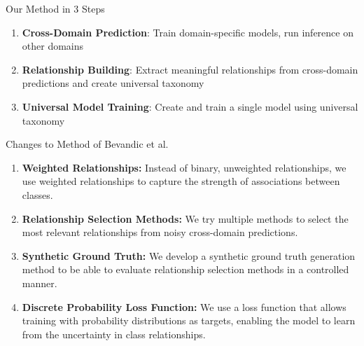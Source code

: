 \documentclass[aspectratio=169]{beamer}
\begin{document}
\begin{frame}{Our Method in 3 Steps}
    \begin{center}
    \end{center}

    \vspace{1em}

    \begin{enumerate}
        \item \textbf{Cross-Domain Prediction}: Train domain-specific models, run inference on other domains
        \item \textbf{Relationship Building}: Extract meaningful relationships from cross-domain predictions and create universal taxonomy
        \item \textbf{Universal Model Training}: Create and train a single model using universal taxonomy
    \end{enumerate}
\end{frame}

\begin{frame}{Changes to Method of Bevandic et al.}
    \begin{enumerate}
        \item \textbf{Weighted Relationships:} Instead of binary, unweighted relationships, we use weighted relationships to capture the strength of associations between classes.
        \item \textbf{Relationship Selection Methods:} We try multiple methods to select the most relevant relationships from noisy cross-domain predictions.
        \item \textbf{Synthetic Ground Truth:} We develop a synthetic ground truth generation method to be able to evaluate relationship selection methods in a controlled manner.
        \item \textbf{Discrete Probability Loss Function:} We use a loss function that allows training with probability distributions as targets, enabling the model to learn from the uncertainty in class relationships.
    \end{enumerate}
\end{frame}
\end{document}
